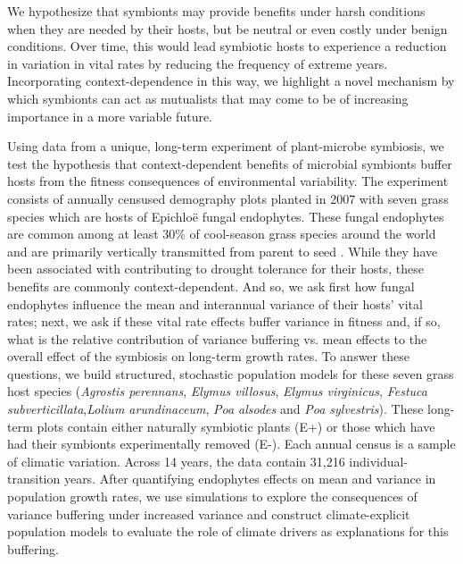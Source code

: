 \documentclass[9pt,twocolumn,twoside,lineno]{pnas-new}
\begin{document}
We hypothesize that symbionts may provide benefits under harsh conditions when they are needed by their hosts, but be neutral or even costly under benign conditions. Over time, this would lead symbiotic hosts to experience a reduction in variation in vital rates by reducing the frequency of extreme years. Incorporating context-dependence in this way, we highlight a novel mechanism by which symbionts can act as mutualists that may come to be of increasing importance in a more variable future.

Using data from a unique, long-term experiment of plant-microbe symbiosis, we test the hypothesis that context-dependent benefits of microbial symbionts buffer hosts from the fitness consequences of environmental variability. The experiment consists of annually censused demography plots planted in 2007 with seven grass species which are hosts of Epichlo\"{e} fungal endophytes. These fungal endophytes are common among at least 30\% of cool-season grass species around the world and are primarily vertically transmitted from parent to seed \cite{cheplick2009ecology}. While they have been associated with contributing to drought tolerance for their hosts, these benefits are commonly context-dependent\cite{cheplick2004recovery, kannadan2008endophyte, decunta2021systematic}. And so, we ask first how fungal endophytes influence the mean and interannual variance of their hosts' vital rates; next, we ask if these vital rate effects buffer variance in fitness and, if so, what is the relative contribution of variance buffering vs. mean effects to the overall effect of the symbiosis on long-term growth rates. To answer these questions, we build structured, stochastic population models for these seven grass host species (\textit{Agrostis perennans}, \textit{Elymus villosus}, \textit{Elymus virginicus}, \textit{Festuca subverticillata},\textit{Lolium arundinaceum}, \textit{Poa alsodes} and \textit{Poa sylvestris}). These long-term plots contain either naturally symbiotic plants (E+) or those which have had their symbionts experimentally removed (E-).  Each annual census is a sample of climatic variation. Across 14 years, the data contain 31,216 individual-transition years. After quantifying endophytes effects on mean and variance in population growth rates, we use simulations to explore the consequences of variance buffering under increased variance and construct climate-explicit population models to evaluate the role of climate drivers as explanations for this buffering. 
\end{document}
